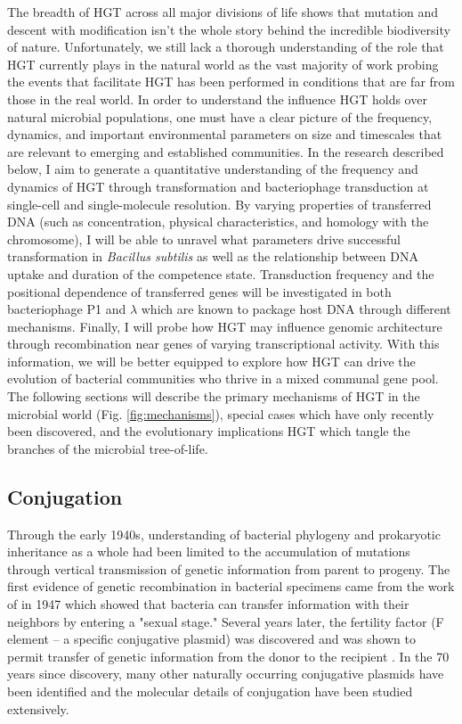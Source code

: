 The breadth of HGT across all major divisions of life shows
that mutation and descent with modification isn't the whole story behind the
incredible biodiversity of nature. Unfortunately, we still lack a thorough
understanding of the role that HGT currently plays in the natural
world as the vast majority of work probing the events that facilitate HGT has been
performed in conditions that are far from those in the real world. In order to understand the
influence HGT holds over natural microbial populations, one must have a clear
picture of the frequency, dynamics, and important environmental parameters on
size and timescales that are relevant to emerging and established communities.
In the research described below, I aim to generate a quantitative understanding
of the frequency and dynamics of HGT through transformation and bacteriophage
transduction at single-cell and single-molecule resolution. By varying
properties of transferred DNA (such as concentration, physical characteristics,
and homology with the chromosome), I will be able to unravel what parameters
drive successful transformation in \textit{Bacillus subtilis} as well as the
relationship between DNA uptake and duration of the competence state. Transduction frequency and the positional dependence of transferred genes will
be investigated in both bacteriophage P1 and $\lambda$ which are known to
package host DNA through different mechanisms. Finally, I will probe how HGT may
influence genomic architecture through recombination near genes of varying
transcriptional activity.  With this
information, we will be better equipped to explore how HGT can drive the
evolution of bacterial communities who thrive in a mixed communal gene pool.
The following sections will describe the primary mechanisms of HGT in the
microbial world (Fig.  \ref{fig:mechanisms}), special cases which have only
recently been discovered, and the evolutionary implications HGT which tangle the
branches of the microbial tree-of-life.


\subsection*{Conjugation}
\indent Through the early 1940s, understanding of bacterial phylogeny and
prokaryotic inheritance as a whole had been limited to the accumulation of
mutations through vertical transmission of genetic information from parent to
progeny. The first evidence of genetic recombination in bacterial specimens came
from the work of \citet{Tatum:1947va} in 1947 which showed that bacteria can
transfer information with their neighbors by entering a "sexual stage." Several
years later, the fertility factor (F element -- a specific conjugative plasmid)
was discovered and was shown to permit transfer of genetic information from the
donor to the recipient \cite{Lederberg:1952wq}. In the 70 years since discovery,
many other naturally occurring conjugative plasmids have been identified
and the molecular details of conjugation have been studied extensively.

